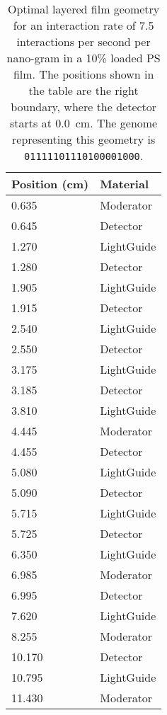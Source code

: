\begin{table}
	\caption[Optimal Layered Film Geometry for 7.5 interaction per second per nanogram Cf-252]{Optimal layered film geometry for an interaction rate of 7.5 interactions per second per nano-gram  in a 10\%  loaded PS film. The positions shown in the table are the right boundary, where the detector starts at \SI{0.0}{\cm}. The genome representing this geometry is \texttt{01111101110100001000}.}
	\label{tab:OptGeoDetailed75}
	\begin{tabular}{m{3cm} m{4cm}}
	\toprule
	Position (\si{\cm}) & Material \\
	\midrule
0.635&Moderator\\
0.645&Detector\\
1.270&LightGuide\\
1.280&Detector\\
1.905&LightGuide\\
1.915&Detector\\
2.540&LightGuide\\
2.550&Detector\\
3.175&LightGuide\\
3.185&Detector\\
3.810&LightGuide\\
4.445&Moderator\\
4.455&Detector\\
5.080&LightGuide\\
5.090&Detector\\
5.715&LightGuide\\
5.725&Detector\\
6.350&LightGuide\\
6.985&Moderator\\
6.995&Detector\\
7.620&LightGuide\\
8.255&Moderator\\
10.170&Detector\\
10.795&LightGuide\\
11.430&Moderator\\
	\bottomrule
	\end{tabular}
\end{table}
